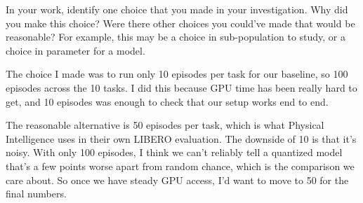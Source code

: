 \documentclass{article}
\begin{document}
\begin{probset}
\begin{prob}
    In your work, identify one choice that you made in your investigation. Why did you make this choice? Were there other choices you could've made that would be reasonable? For example, this may be a choice in sub-population to study, or a choice in parameter for a model.

    \begin{soln}
        The choice I made was to run only 10 episodes per task for our baseline, so 100 episodes across the 10 tasks. I did this because GPU time has been really hard to get, and 10 episodes was enough to check that our setup works end to end.

        The reasonable alternative is 50 episodes per task, which is what Physical Intelligence uses in their own LIBERO evaluation. The downside of 10 is that it's noisy. With only 100 episodes, I think we can't reliably tell a quantized model that's a few points worse apart from random chance, which is the comparison we care about. So once we have steady GPU access, I'd want to move to 50 for the final numbers.
    \end{soln}
\end{prob}
\end{probset}
\end{document}
